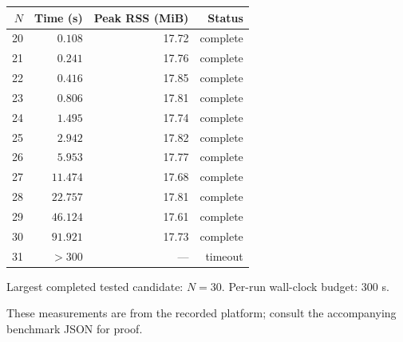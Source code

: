 \begin{tabular}{rrrr}\toprule $N$ & Time (s) & Peak RSS (MiB) & Status \\\midrule
20 & $0.108$ & 17.72 & complete \\
21 & $0.241$ & 17.76 & complete \\
22 & $0.416$ & 17.85 & complete \\
23 & $0.806$ & 17.81 & complete \\
24 & $1.495$ & 17.74 & complete \\
25 & $2.942$ & 17.82 & complete \\
26 & $5.953$ & 17.77 & complete \\
27 & $11.474$ & 17.68 & complete \\
28 & $22.757$ & 17.81 & complete \\
29 & $46.124$ & 17.61 & complete \\
30 & $91.921$ & 17.73 & complete \\
31 & $>300$ & --- & timeout \\
\bottomrule\end{tabular}
\par\smallskip Largest completed tested candidate: $N=30$. 
Per-run wall-clock budget: 300 s. 
\par\smallskip 
These measurements are from the recorded platform; consult the accompanying benchmark JSON for proof.

